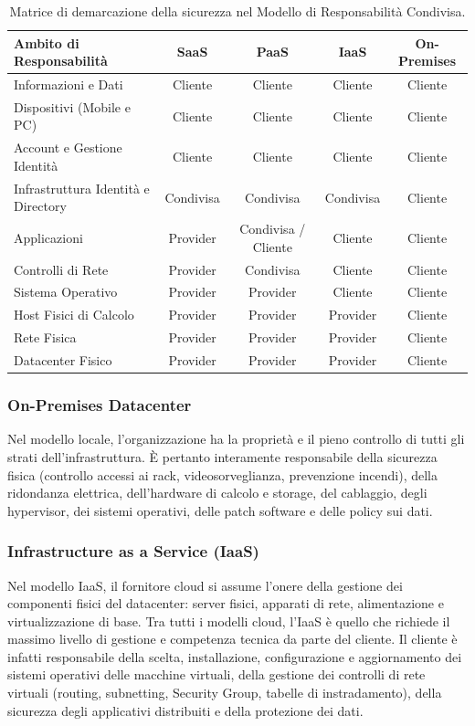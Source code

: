\documentclass[11pt, a4paper]{article}
\begin{document}
\begin{table}[H]
\centering
\small
\begin{tabularx}{\textwidth}{lcccc}
\toprule
\textbf{Ambito di Responsabilità} & \textbf{SaaS} & \textbf{PaaS} & \textbf{IaaS} & \textbf{On-Premises} \\
\midrule
Informazioni e Dati & Cliente & Cliente & Cliente & Cliente \\
Dispositivi (Mobile e PC) & Cliente & Cliente & Cliente & Cliente \\
Account e Gestione Identità & Cliente & Cliente & Cliente & Cliente \\
Infrastruttura Identità e Directory & Condivisa & Condivisa & Condivisa & Cliente \\
Applicazioni & Provider & Condivisa / Cliente & Cliente & Cliente \\
Controlli di Rete & Provider & Condivisa & Cliente & Cliente \\
Sistema Operativo & Provider & Provider & Cliente & Cliente \\
Host Fisici di Calcolo & Provider & Provider & Provider & Cliente \\
Rete Fisica & Provider & Provider & Provider & Cliente \\
Datacenter Fisico & Provider & Provider & Provider & Cliente \\
\bottomrule
\end{tabularx}
\caption{Matrice di demarcazione della sicurezza nel Modello di Responsabilità Condivisa.}
\end{table}

\subsubsection{On-Premises Datacenter}
Nel modello locale, l'organizzazione ha la proprietà e il pieno controllo di tutti gli strati dell'infrastruttura. È pertanto interamente responsabile della sicurezza fisica (controllo accessi ai rack, videosorveglianza, prevenzione incendi), della ridondanza elettrica, dell'hardware di calcolo e storage, del cablaggio, degli hypervisor, dei sistemi operativi, delle patch software e delle policy sui dati.

\subsubsection{Infrastructure as a Service (IaaS)}
Nel modello IaaS, il fornitore cloud si assume l'onere della gestione dei componenti fisici del datacenter: server fisici, apparati di rete, alimentazione e virtualizzazione di base. Tra tutti i modelli cloud, l'IaaS è quello che richiede il massimo livello di gestione e competenza tecnica da parte del cliente. Il cliente è infatti responsabile della scelta, installazione, configurazione e aggiornamento dei sistemi operativi delle macchine virtuali, della gestione dei controlli di rete virtuali (routing, subnetting, Security Group, tabelle di instradamento), della sicurezza degli applicativi distribuiti e della protezione dei dati.
\end{document}
